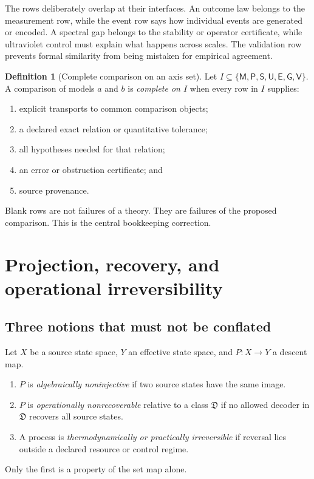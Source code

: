 \documentclass[11pt]{article}
\theoremstyle{definition}
\newtheorem{definition}[theorem]{Definition}
\theoremstyle{remark}
\newcommand{\axis}[1]{\mathsf{#1}}
\begin{document}
The rows deliberately overlap at their interfaces. An outcome law belongs to
the measurement row, while the event row says how individual events are
generated or encoded. A spectral gap belongs to the stability or operator
certificate, while ultraviolet control must explain what happens across scales.
The validation row prevents formal similarity from being mistaken for
empirical agreement.

\begin{definition}[Complete comparison on an axis set]
Let \(I\subseteq\{\axis{M},\axis{P},\axis{S},\axis{U},
\axis{E},\axis{G},\axis{V}\}\). A comparison of models \(a\) and \(b\) is
\emph{complete on \(I\)} when every row in \(I\) supplies:
\begin{enumerate}[label=(\roman*)]
  \item explicit transports to common comparison objects;
  \item a declared exact relation or quantitative tolerance;
  \item all hypotheses needed for that relation;
  \item an error or obstruction certificate; and
  \item source provenance.
\end{enumerate}
\end{definition}

Blank rows are not failures of a theory. They are failures of the proposed
comparison. This is the central bookkeeping correction.

\section{Projection, recovery, and operational irreversibility}
\label{sec:projection}

\subsection{Three notions that must not be conflated}

Let \(X\) be a source state space, \(Y\) an effective state space, and
\(P:X\to Y\) a descent map.
\begin{enumerate}[label=(\arabic*)]
  \item \(P\) is \emph{algebraically noninjective} if two source states have the
  same image.
  \item \(P\) is \emph{operationally nonrecoverable} relative to a class
  \(\mathfrak D\) if no allowed decoder in \(\mathfrak D\) recovers all source
  states.
  \item A process is \emph{thermodynamically or practically irreversible} if
  reversal lies outside a declared resource or control regime.
\end{enumerate}
Only the first is a property of the set map alone.
\end{document}
